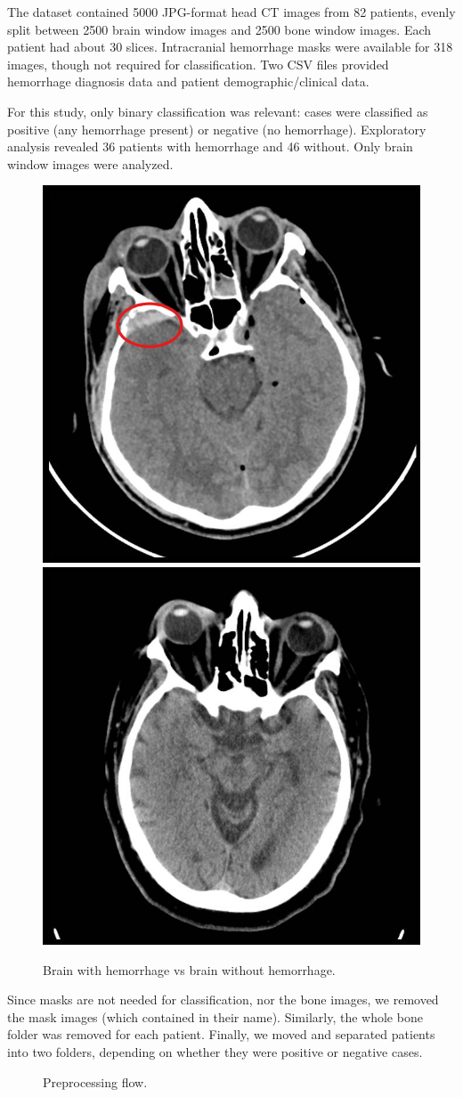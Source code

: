 The dataset \cite{brain-dataset} contained 5000 JPG-format head CT images from 82 patients, evenly split between 2500 brain window images and 2500 bone window images. Each patient had about 30 slices. Intracranial hemorrhage masks were available for 318 images, though not required for classification. Two CSV files provided hemorrhage diagnosis data and patient demographic/clinical data.

For this study, only binary classification was relevant: cases were classified as positive (any hemorrhage present) or negative (no hemorrhage). Exploratory analysis revealed 36 patients with hemorrhage and 46 without. Only brain window images were analyzed.

\begin{figure}[htbp]
    \centerline{\includegraphics[width=0.45\linewidth]{imgs//dataset/positive.png}\includegraphics[width=0.45\linewidth]{imgs//dataset/negative.png}}
    \caption{Brain with hemorrhage vs brain without hemorrhage.}
    \label{fig:brain_images}
\end{figure}

Since masks are not needed for classification, nor the bone images, we removed the mask images (which contained  in their name). Similarly, the whole bone folder was removed for each patient. Finally, we moved and separated patients into two folders, depending on whether they were positive or negative cases.

\begin{figure}[h]
    \centering
    \scalebox{0.5}{}
    \caption{Preprocessing flow.}
    \label{fig:preprocessing_flow}
\end{figure}
